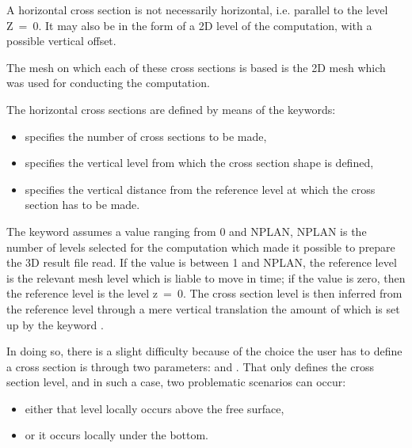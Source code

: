 A horizontal cross section is not necessarily horizontal, i.e. parallel to the
level Z~=~0. It may also be in the form of a 2D level of the 
computation, with a possible vertical offset.

The mesh on which each of these cross sections is based is the 2D mesh which
was used for conducting the  computation.

The horizontal cross sections are defined by means of the keywords:

\begin{itemize}
\item {} specifies the number of
cross sections to be made,

\item {} specifies the
 vertical level from which the cross section shape is defined,

\item {} specifies the vertical distance
from the reference level at which the cross section has to be made.
\end{itemize}

The keyword  assumes a value ranging from 0 and NPLAN,
NPLAN is the number of levels selected for the  computation which
made it possible to prepare the 3D result file read. If the value is between 1
and NPLAN, the reference level is the relevant mesh level which is liable to
move in time; if the value is zero, then the reference level is the level
z~=~0. The cross section level is then inferred from the reference level
through a mere vertical translation the amount of which is set up by the
keyword .

In doing so, there is a slight difficulty because of the choice the user has to
define a cross section is through two parameters:  and .
That only defines the cross section level, and in such a case, two problematic
scenarios can occur:

\begin{itemize}
\item either that level locally occurs above the free surface,
\item or it occurs locally under the bottom.
\end{itemize}


